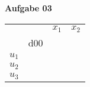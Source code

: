 \documentclass[a4paper,10pt]{article}
\begin{document}
	\parindent0pt
	\textbf{Aufgabe 03}\\
	\begin{tabular}{cccc}
		\cline{3-4}
								 & \multicolumn{1}{c|}{}    & \multicolumn{1}{c}{$x_1$} & \multicolumn{1}{c}{$x_2$} \\ \cline{2-4} 
		\multicolumn{1}{c|}{}    & \multicolumn{1}{c|}{d00} & \multicolumn{1}{l}{}   & \multicolumn{1}{l}{}   \\ \hline
		\multicolumn{1}{|c|}{$u_1$} & \multicolumn{1}{c|}{}    &                        &                        \\ 
		\multicolumn{1}{|c|}{$u_2$} & \multicolumn{1}{c|}{}    &                        &                        \\ 
		\multicolumn{1}{|c|}{$u_3$} & \multicolumn{1}{c|}{}    &                        &                                              
	\end{tabular}
\end{document}
